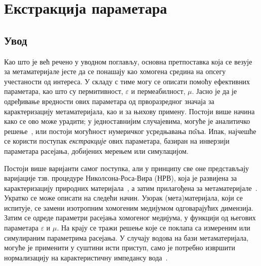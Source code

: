 




\newcommand{\sirina}{\columnwidth}
\newcommand{\sirinab}{\columnwidth}
\newcommand{\sirinac}{0.48\columnwidth}
\newcommand{\SkalaA}{0.3}
\newcommand{\SkalaB}{0.3}
\newcommand{\SkalaC}{0.3}
\newcommand{\subscript}[1]{\ensuremath{_{\textrm{#1}}}}




%
\newcommand{\ga}{\Gamma\Pi}

\chapter{Екстракција параметара}

\section{Увод}

Као што је већ речено у уводном поглављу, основна претпоставка која се везује за метаматеријале јесте да се понашају као хомогена средина на опсегу учестаности од интереса. У складу с тиме могу се описати помоћу ефективних параметара, као што су пермитивност, $\varepsilon$ и пермеабилност, $\mu$. Јасно је да је одређивање вредности ових параметара од прворазредног значаја за карактеризацију метаматеријала, као и за њихову примену. Постоји више начина како се ово може урадити; у једноставнијим случајевима, могуће је аналитичко решење~\cite{pendri:99}, или постоји могућност нумеричког усредњавања п\^{о}ља. Ипак, најчешће се користи поступак \emph{екстракције} ових параметара, базиран на инверзији параметара расејања, добијених мерењем или симулацијом.

Постоји више варијанти самог поступка, али у принципу све оне представљају варијације тзв. процедуре Николсона-Роса-Вира (НРВ), која је развијена за карактеризацију природних материјала~\cite{Nicol:70,Weir:74}, а затим прилагођена за метаматеријале~\cite{Smith:02,Markos:03}. Укратко се може описати на следећи начин. Узорак (мета)материјала, који се испитује, се замени изотропним хомогеним медијумом одговарајућих димензија. Затим се одреде параметри расејања хомогеног медијума, у функцији од његових параметара $\varepsilon$ и $\mu$. На крају се тражи решење које се поклапа са измереним или симулираним параметрима расејања. У случају водова на бази метаматеријала, могуће је применити у суштини исти приступ, само је потребно извршити нормализацију на карактеристичну импедансу вода~\cite{Mao:05}.

